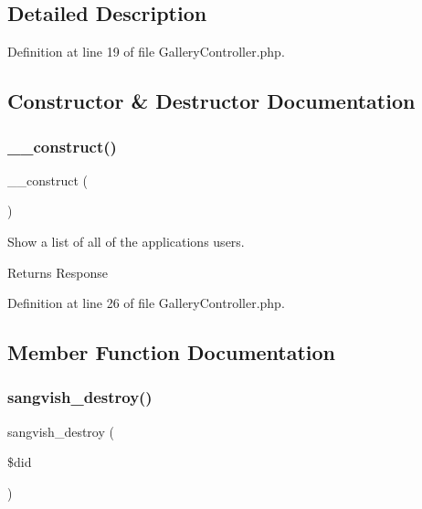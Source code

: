 \subsection{Detailed Description}


Definition at line 19 of file Gallery\+Controller.\+php.



\subsection{Constructor \& Destructor Documentation}
\mbox{\label{class_responsive_1_1_http_1_1_controllers_1_1_gallery_controller_a095c5d389db211932136b53f25f39685}} 
\subsubsection{\texorpdfstring{\_\_construct()}{\_\_construct()}}
{\footnotesize\ttfamily \+\_\+\+\_\+construct (\begin{DoxyParamCaption}{ }\end{DoxyParamCaption})}

Show a list of all of the application\textquotesingle{}s users.

\begin{DoxyReturn}{Returns}
Response 
\end{DoxyReturn}


Definition at line 26 of file Gallery\+Controller.\+php.



\subsection{Member Function Documentation}
\mbox{\label{class_responsive_1_1_http_1_1_controllers_1_1_gallery_controller_a4ef7021a71a781742edf692230b3626b}} 
\subsubsection{\texorpdfstring{sangvish\_destroy()}{sangvish\_destroy()}}
{\footnotesize\ttfamily sangvish\+\_\+destroy (\begin{DoxyParamCaption}\item[{}]{\$did }\end{DoxyParamCaption})}



